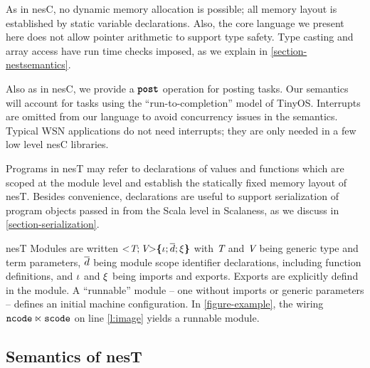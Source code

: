 As in nesC, no dynamic memory allocation is possible; all memory
layout is established by static variable declarations.  Also, the core
language we present here does not allow pointer arithmetic to support
type safety. Type casting and array access have run time checks
imposed, as we explain in \autoref{section-nestsemantics}.  

Also as in nesC, we provide a $\kwpost$ operation for posting tasks.
Our semantics will account for tasks using the ``run-to-completion''
model of TinyOS.  Interrupts are omitted from our language to avoid
concurrency issues in the semantics.  Typical WSN
applications do not need interrupts; they are only needed in a few
low level nesC libraries.

Programs in nesT may refer to declarations of values 
and functions which are scoped at the module level and establish the
statically fixed memory layout of nesT.
Besides convenience, declarations
are useful to support serialization of program objects passed in from
the Scala level in Scalaness, as we discuss in
\autoref{section-serialization}.

nesT Modules are written $\margs{\tpdecl; \vpdecl}\lc \imports; \decls
\exports \rc $ with $\tpdecl$ and $\vpdecl$ being generic type and
term parameters, $\vect{d}$ being module scope identifier
declarations, including function definitions, and $\imports$ and
$\exports$ being imports and exports.  Exports are explicitly defind
in the module. A ``runnable'' module -- one without imports or generic
parameters -- defines an initial machine configuration. In
\autoref{figure-example}, the wiring $\tt{ncode} \ltimes \tt{scode}$
on line \ref{l:image} yields a runnable module.

\tasksemanticsfig


\subsection{Semantics of nesT} 
\label{section-nestsemantics}

